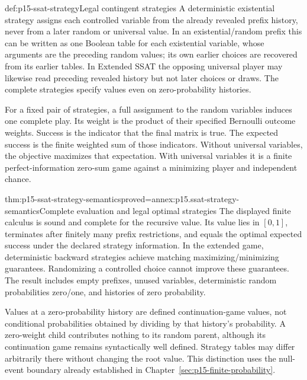 \begin{hbdefinition}{def:p15-ssat-strategy}{Legal contingent strategies}
A deterministic existential strategy assigns each controlled variable
from the already revealed prefix history, never from a later random
or universal value. In an existential/random prefix this can be written
as one Boolean table for each existential variable, whose arguments are
the preceding random values; its own earlier choices are recovered from
its earlier tables. In Extended SSAT the opposing universal player may
likewise read preceding revealed history but not later choices or draws.
The complete strategies specify values even on zero-probability histories.

For a fixed pair of strategies, a full assignment to the random variables
induces one complete play. Its weight is the product of their specified
Bernoulli outcome weights. Success is the indicator that the final matrix
is true. The expected success is the finite weighted sum of those
indicators. Without universal variables, the objective maximizes that
expectation. With universal variables it is a finite perfect-information
zero-sum game against a minimizing player and independent chance.
\end{hbdefinition}

\begin{hbtheorem}{thm:p15-ssat-strategy-semantics}{proved=annex:p15.ssat-strategy-semantics}{Complete evaluation and legal optimal strategies}
The displayed finite calculus is sound and complete for the recursive
value. Its value lies in \([0,1]\), terminates after finitely many
prefix restrictions, and equals the optimal expected success under the
declared strategy information. In the extended game, deterministic
backward strategies achieve matching maximizing/minimizing guarantees.
Randomizing a controlled choice cannot improve these guarantees.
The result includes empty prefixes, unused variables, deterministic
random probabilities zero/one, and histories of zero probability.
\end{hbtheorem}

Values at a zero-probability history are defined continuation-game values,
not conditional probabilities obtained by dividing by that history's
probability. A zero-weight child contributes nothing to its random parent,
although its continuation game remains syntactically well defined.
Strategy tables may differ arbitrarily there without changing the root
value. This distinction uses the null-event boundary already established
in Chapter~\ref{sec:p15-finite-probability}.

